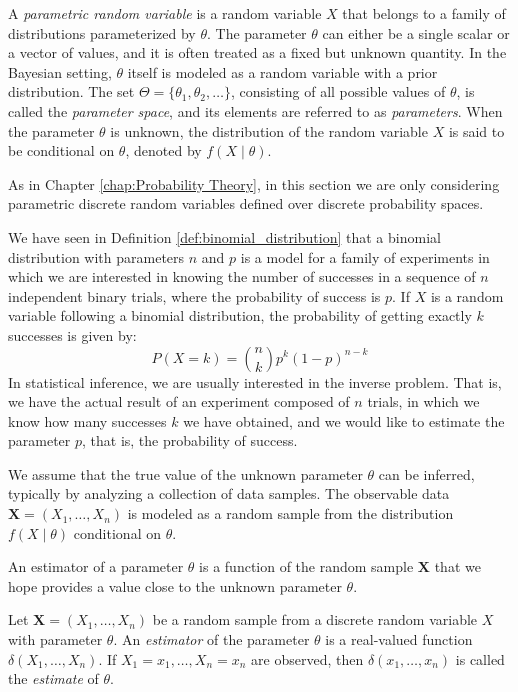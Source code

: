 A \emph{parametric random variable} is a random variable $X$ that belongs to a family of distributions parameterized by $\theta$. The parameter $\theta$ can either be a single scalar or a vector of values, and it is often treated as a fixed but unknown quantity. In the Bayesian setting, $\theta$ itself is modeled as a random variable with a prior distribution. The set $\Theta = \{ \theta_1, \theta_2, \ldots \}$, consisting of all possible values of $\theta$, is called the \emph{parameter space}, and its elements are referred to as \emph{parameters}. When the parameter $\theta$ is unknown, the distribution of the random variable $X$ is said to be conditional on $\theta$, denoted by $f\left(X \mid \theta \right)$.

As in Chapter \ref{chap:Probability Theory}, in this section we are only considering parametric discrete random variables defined over discrete probability spaces.

\begin{example}
We have seen in Definition \ref{def:binomial_distribution} that a binomial distribution with parameters $n$ and $p$ is a model for a family of experiments in which we are interested in knowing the number of successes in a sequence of $n$ independent binary trials, where the probability of success is $p$. If $X$ is a random variable following a binomial distribution, the probability of getting exactly $k$ successes is given by:
\[
P(X=k) = {\binom {n}{k}}p^{k}(1-p)^{n-k}
\]
In statistical inference, we are usually interested in the inverse problem. That is, we have the actual result of an experiment composed of $n$ trials, in which we know how many successes $k$ we have obtained, and we would like to estimate the parameter $p$, that is, the probability of success.
\end{example}

We assume that the true value of the unknown parameter $\theta$ can be inferred, typically by analyzing a collection of data samples. The observable data $\mathbf{X}=\left(X_{1},\ldots,X_{n}\right)$ is modeled as a random sample from the distribution $f\left(X \mid \theta \right)$ conditional on $\theta$.

An estimator of a parameter $\theta$ is a function of the random sample $\mathbf{X}$ that we hope provides a value close to the unknown parameter $\theta$.

\begin{definition}
Let $\mathbf{X}=\left(X_{1},\ldots,X_{n}\right)$ be a random sample from a discrete random variable $X$ with parameter $\theta$. An \emph{estimator} of the parameter $\theta$ is a real-valued function $\delta\left( X_1, \ldots, X_n \right)$. If $X_1 = x_1, \ldots, X_n = x_n$ are observed, then $\delta\left( x_1, \ldots, x_n \right)$ is called the \emph{estimate} of $\theta$.
\end{definition}

